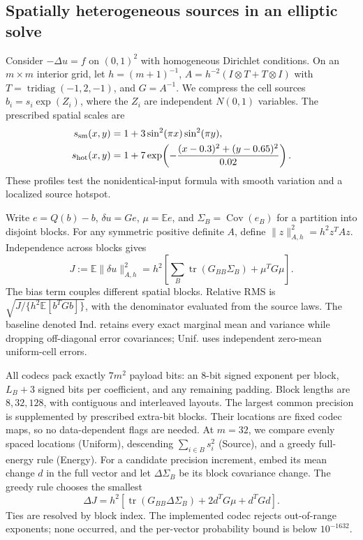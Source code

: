 \subsection{Spatially heterogeneous sources in an elliptic solve}
\label{sec:revision-elliptic2d}
Consider $-\Delta u=f$ on $(0,1)^2$ with homogeneous Dirichlet conditions.
On an $m\times m$ interior grid, let $h=(m+1)^{-1}$,
$A=h^{-2}(I\otimes T+T\otimes I)$ with
$T=\operatorname{tridiag}(-1,2,-1)$, and $G=A^{-1}$.
We compress the cell sources $b_i=s_i\exp(Z_i)$, where the $Z_i$ are
independent $N(0,1)$ variables. The prescribed spatial scales are
\begin{align*}
 s_{\rm sm}(x,y)&=1+3\sin^2(\pi x)\sin^2(\pi y),\\
 s_{\rm hot}(x,y)&=1+7\exp\!\left(-\frac{(x-0.3)^2+(y-0.65)^2}{0.02}\right).
\end{align*}
These profiles test the nonidentical-input formula with smooth variation
and a localized source hotspot.

Write $e=Q(b)-b$, $\delta u=Ge$, $\mu=\mathbb E e$, and
$\Sigma_B=\operatorname{Cov}(e_B)$ for a partition into disjoint blocks.
For any symmetric positive definite $A$, define $\|z\|_{A,h}^2=h^2z^TAz$.
Independence across blocks gives
\begin{equation}\label{eq:revision-elliptic2d-energy}
 J:=\mathbb E\|\delta u\|_{A,h}^2
 =h^2\left[\sum_B\operatorname{tr}(G_{BB}\Sigma_B)
                 +\mu^TG\mu\right].
\end{equation}
The bias term couples different spatial blocks. Relative RMS is
$\sqrt{J/\{h^2\mathbb E[b^TGb]\}}$, with the denominator evaluated
from the source laws. The baseline denoted Ind. retains every exact
marginal mean and variance while dropping off-diagonal error covariances;
Unif. uses independent zero-mean uniform-cell errors.

All codecs pack exactly $7m^2$ payload bits: an 8-bit signed exponent per
block, $L_B+3$ signed bits per coefficient, and any remaining padding.
Block lengths are $8,32,128$, with contiguous and interleaved layouts.
The largest common precision is supplemented by prescribed extra-bit
blocks. Their locations are fixed codec maps, so no data-dependent flags
are needed. At $m=32$, we compare evenly spaced locations (Uniform),
descending $\sum_{i\in B}s_i^2$ (Source), and a greedy full-energy rule
(Energy). For a candidate precision increment, embed its mean change
$d$ in the full vector and let $\Delta\Sigma_B$ be its block covariance
change. The greedy rule chooses the smallest
\begin{equation}\label{eq:revision-elliptic2d-increment}
 \Delta J=h^2\left[\operatorname{tr}(G_{BB}\Delta\Sigma_B)
                     +2d^TG\mu+d^TGd\right].
\end{equation}
Ties are resolved by block index. The implemented codec rejects
out-of-range exponents; none occurred, and the per-vector probability
bound is below $10^{-1632}$.

